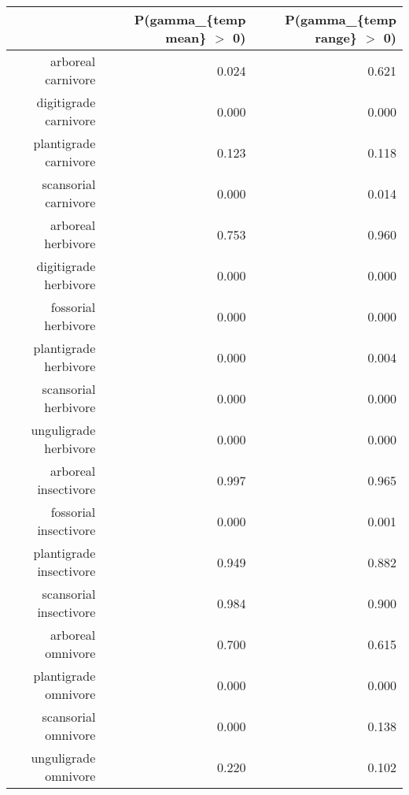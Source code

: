 \begin{table}[ht]
\centering
\begin{tabular}{rrr}
  \hline
 & P(gamma\_\{temp mean\} $>$ 0) & P(gamma\_\{temp range\} $>$ 0) \\ 
  \hline
arboreal carnivore & 0.024 & 0.621 \\ 
  digitigrade carnivore & 0.000 & 0.000 \\ 
  plantigrade carnivore & 0.123 & 0.118 \\ 
  scansorial carnivore & 0.000 & 0.014 \\ 
  arboreal herbivore & 0.753 & 0.960 \\ 
  digitigrade herbivore & 0.000 & 0.000 \\ 
  fossorial herbivore & 0.000 & 0.000 \\ 
  plantigrade herbivore & 0.000 & 0.004 \\ 
  scansorial herbivore & 0.000 & 0.000 \\ 
  unguligrade herbivore & 0.000 & 0.000 \\ 
  arboreal insectivore & 0.997 & 0.965 \\ 
  fossorial insectivore & 0.000 & 0.001 \\ 
  plantigrade insectivore & 0.949 & 0.882 \\ 
  scansorial insectivore & 0.984 & 0.900 \\ 
  arboreal omnivore & 0.700 & 0.615 \\ 
  plantigrade omnivore & 0.000 & 0.000 \\ 
  scansorial omnivore & 0.000 & 0.138 \\ 
  unguligrade omnivore & 0.220 & 0.102 \\ 
   \hline
\end{tabular}
\label{tab:occur_temp}
\end{table}
